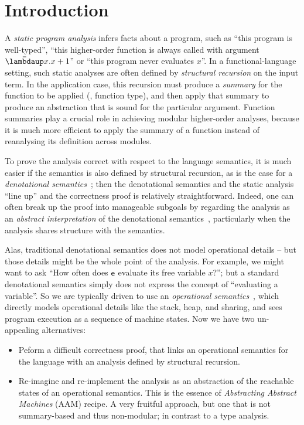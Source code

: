\section{Introduction}
\label{sec:introduction}

A \emph{static program analysis} infers facts about a program, such
as ``this program is well-typed'', ``this higher-order function is always called
with argument $\Lam{x}{x+1}$'' or ``this program never evaluates $x$''.
In a functional-language setting, such static analyses are
often defined by \emph{structural recursion} on the input term.
In the application case, this recursion must produce a \emph{summary}
for the function to be applied (\ie, function type), and then apply that summary
to produce an abstraction that is sound for the particular argument.
Function summaries play a crucial role in achieving modular higher-order
analyses, because it is much more efficient to apply the summary of a function
instead of reanalysing its definition across modules.

To prove the analysis correct with respect to the language semantics,
it is much easier if the semantics is also defined by structural recursion,
as is the case for a \emph{denotational semantics}~\citep{ScottStrachey:71};
then the denotational semantics and the static analysis
``line up'' and the correctness proof is relatively straightforward.
Indeed, one can often break up the proof into manageable subgoals by regarding
the analysis as an \emph{abstract interpretation} of the denotational
semantics~\citep{Cousot:21}, particularly when the analysis shares structure
with the semantics.

Alas, traditional denotational semantics does not model operational details --
but those details might be the whole point of the analysis.
For example, we might want to ask ``How often does $\mathsf{e}$ evaluate its free
variable $x$?''; but a standard denotational semantics simply does not express
the concept of ``evaluating a variable''.
So we are typically driven to use an \emph{operational
semantics}~\citep{Plotkin:81}, which directly models operational details like
the stack, heap, and sharing, and sees program execution as a sequence of
machine states.
Now we have two un-appealing alternatives:
\begin{itemize}
\item Peform a difficult correctness proof, that links an operational semantics for the language
  with an analysis defined by structural recursion.
\item Re-imagine and re-implement the analysis as an abstraction of the
  reachable states of an operational semantics.
  This is the essence of \emph{Abstracting Abstract Machines} (AAM) \cite{aam}
  recipe.
  A very fruitful approach, but one that is not summary-based and thus
  non-modular; in contrast to a type analysis.
\end{itemize}

